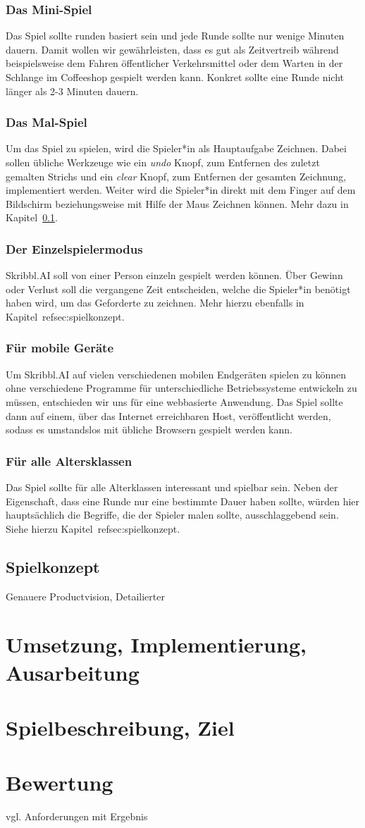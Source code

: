 \documentclass[11pt]{article}
\begin{document}
\subsubsection{Das Mini-Spiel}
Das Spiel sollte runden basiert sein und jede Runde sollte nur wenige Minuten dauern. Damit wollen wir gewährleisten, dass es gut als Zeitvertreib während beispielsweise dem Fahren öffentlicher Verkehrsmittel oder dem Warten in der Schlange im Coffeeshop gespielt werden kann. Konkret sollte eine Runde nicht länger als 2-3 Minuten dauern.
\subsubsection{Das Mal-Spiel}
Um das Spiel zu spielen, wird die Spieler*in als Hauptaufgabe Zeichnen. Dabei sollen übliche Werkzeuge wie ein \textit{undo} Knopf, zum Entfernen des zuletzt gemalten Strichs und ein \textit{clear} Knopf, zum Entfernen der gesamten Zeichnung, implementiert werden. Weiter wird die Spieler*in direkt mit dem Finger auf dem Bildschirm beziehungsweise mit Hilfe der Maus Zeichnen können. Mehr dazu in Kapitel~\ref{sec:spielkonzept}.
\subsubsection{Der Einzelspielermodus}
Skribbl.AI soll von einer Person einzeln gespielt werden können. Über Gewinn oder Verlust soll die vergangene Zeit entscheiden, welche die Spieler*in benötigt haben wird, um das Geforderte zu zeichnen. Mehr hierzu ebenfalls in Kapitel~ref{sec:spielkonzept}.
\subsubsection{Für mobile Geräte}
Um Skribbl.AI auf vielen verschiedenen mobilen Endgeräten spielen zu können ohne verschiedene Programme für unterschiedliche Betriebssysteme entwickeln zu müssen, entschieden wir uns für eine webbasierte Anwendung. Das Spiel sollte dann auf einem, über das Internet erreichbaren Host, veröffentlicht werden, sodass es umstandslos mit übliche Browsern gespielt werden kann.
\subsubsection{Für alle Altersklassen}
Das Spiel sollte für alle Alterklassen interessant und spielbar sein. Neben der Eigenschaft, dass eine Runde nur eine bestimmte Dauer haben sollte, würden hier hauptsächlich die Begriffe, die der Spieler malen sollte, ausschlaggebend sein. Siehe hierzu Kapitel~ref{sec:spielkonzept}.
\subsection{Spielkonzept}
\label{sec:spielkonzept}
Genauere Productvision, Detailierter
\section{Umsetzung, Implementierung, Ausarbeitung}
\section{Spielbeschreibung, Ziel}
\section{Bewertung}
vgl. Anforderungen mit Ergebnis

\pagebreak
\printbibliography
\end{document}
